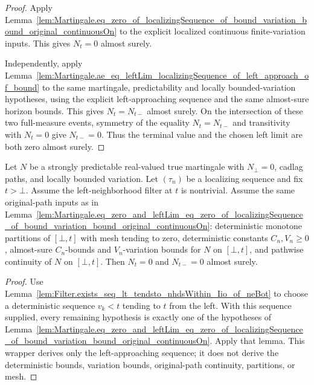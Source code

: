 \begin{proof}
Apply
Lemma~\ref{lem:Martingale.eq_zero_of_localizingSequence_of_bound_variation_bound_original_continuousOn}
to the explicit localized continuous finite-variation inputs.  This gives
\(N_t=0\) almost surely.

Independently, apply
Lemma~\ref{lem:Martingale.ae_eq_leftLim_localizingSequence_of_left_approach_of_bound}
to the same martingale, predictability and locally bounded-variation
hypotheses, using the explicit left-approaching sequence and the same
almost-sure horizon bounds.  This gives \(N_t=N_{t-}\) almost surely.  On the
intersection of these two full-measure events, symmetry of the equality
\(N_t=N_{t-}\) and transitivity with \(N_t=0\) give \(N_{t-}=0\).  Thus the
terminal value and the chosen left limit are both zero almost surely.
\end{proof}

\begin{lemma}\label{lem:Martingale.eq_zero_and_leftLim_eq_zero_of_localizingSequence_of_bound_variation_bound_original_continuousOn_of_neBot_left}
Let \(N\) be a strongly predictable real-valued true martingale with
\(N_\bot=0\), cadlag paths, and locally bounded variation.  Let
\((\tau_n)\) be a localizing sequence and fix \(t>\bot\).  Assume the
left-neighborhood filter at \(t\) is nontrivial.  Assume the same original-path
inputs as in
Lemma~\ref{lem:Martingale.eq_zero_and_leftLim_eq_zero_of_localizingSequence_of_bound_variation_bound_original_continuousOn}:
deterministic monotone partitions of \([\bot,t]\) with mesh tending to zero,
deterministic constants \(C_n,V_n\ge0\), almost-sure \(C_n\)-bounds and
\(V_n\)-variation bounds for \(N\) on \([\bot,t]\), and pathwise continuity of
\(N\) on \([\bot,t]\).  Then \(N_t=0\) and \(N_{t-}=0\) almost surely.
\end{lemma}

\begin{proof}
Use
Lemma~\ref{lem:Filter.exists_seq_lt_tendsto_nhdsWithin_Iio_of_neBot}
to choose a deterministic sequence \(v_k<t\) tending to \(t\) from the left.
With this sequence supplied, every remaining hypothesis is exactly one of the
hypotheses of
Lemma~\ref{lem:Martingale.eq_zero_and_leftLim_eq_zero_of_localizingSequence_of_bound_variation_bound_original_continuousOn}.
Apply that lemma.  This wrapper derives only the left-approaching sequence; it
does not derive the deterministic bounds, variation bounds, original-path
continuity, partitions, or mesh.
\end{proof}

